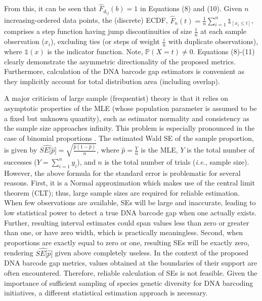 \documentclass[12pt]{article}
\begin{document}
\noindent From this, it can be seen that $\hat{F}_{d_{ij}}(b) = 1$ in Equations (8) and (10). Given $n$ \\ increasing-ordered data points, the (discrete) ECDF, $\hat{F}_n(t) = \frac{1}{n}\sum_{i = 1}^n\mathds{1}_{[x_i \leq t]}$, comprises a step function having jump discontinuities of size $\frac{1}{n}$ at each sample observation ($x_i$), excluding ties (or steps of weight $\frac{i}{n}$ with duplicate observations), where $\mathds{1}(x)$ is the indicator function. Note, $\mathbb{P}(X = t) \neq 0$. Equations (8)-(11) clearly demonstrate the asymmetric directionality of the proposed metrics. Furthermore, calculation of the DNA barcode gap estimators is convenient as they implicitly account for total distribution area (including overlap).

A major criticism of large sample (frequentist) theory is that it relies on asymptotic properties of the MLE (whose population parameter is assumed to be a fixed but unknown quantity), such as estimator normality and consistency as the sample size approaches infinity. This problem is especially pronounced in the case of binomial proportions \citep{newcombe1998confidence}. The estimated Wald SE of the sample proportion, is given by $\widehat{SE[\hat{p}}] = \sqrt{\frac{\hat{p}(1 - \hat{p})}{n}}$, where $\hat{p} = \frac{Y}{n}$ is the MLE, $Y$ is the total number of successes ($Y = \sum_{i=1}^n{y_i}$), and $n$ is the total number of trials (\textit{i.e.}, sample size). However, the above formula for the standard error is problematic for several reasons. First, it is a Normal approximation which makes use of the central limit theorem (CLT); thus, large sample sizes are required for reliable estimation. When few observations are available, SEs will be large and inaccurate, leading to low statistical power to detect a true DNA barcode gap when one actually exists. Further, resulting interval estimates could span values less than zero or greater than one, or have zero width, which is practically meaningless. Second, when proportions are exactly equal to zero or one, resulting SEs will be exactly zero, rendering $\widehat{SE[\hat{p}}]$ given above completely useless. In the context of the proposed DNA barcode gap metrics, values obtained at the boundaries of their support are often encountered. Therefore, reliable calculation of SEs is not feasible. Given the importance of sufficient sampling of species genetic diversity for DNA barcoding initiatives, a different statistical estimation approach is necessary. 
\end{document}
